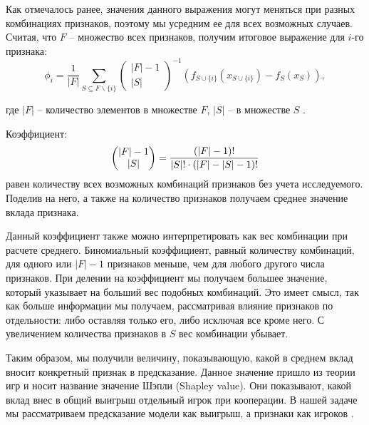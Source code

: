 Как отмечалось ранее, значения данного выражения могут меняться при разных комбинациях признаков, поэтому мы усредним ее для всех возможных случаев. Считая, что $F$ -- множество всех признаков, получим итоговое выражение для $i$-го признака:
\vspace{-1mm}
\[
\phi_i = \frac{1}{|F|} \sum\limits_{S \subseteq F \backslash \{i\}}
\begin{pmatrix}
|F| - 1 \\
|S|
\end{pmatrix}^{-1}
(f_{S \cup \{i\}}(x_{S \cup \{i\}}) - f_S(x_S)),
\]
\vspace{-5mm}

где $|F|$ -- количество элементов в множестве $F$, $|S|$ -- в множестве $S$ \cite{basis, shap}.

Коэффициент:
\[
\displaystyle \begin{pmatrix}
|F| - 1 \\
|S|
\end{pmatrix} = \frac{(|F|-1)!}{|S|! \cdot (|F| - |S| - 1)!}
\]
равен количеству всех возможных комбинаций признаков без учета исследуемого. Поделив на него, а также на количество признаков получаем среднее значение вклада признака.

Данный коэффициент также можно интерпретировать как вес комбинации при расчете среднего. Биномиальный коэффициент, равный количеству комбинаций, для одного или $|F|-1$ признаков меньше, чем для любого другого числа признаков. При делении на коэффициент мы получаем большее значение, который указывает на больший вес подобных комбинаций. Это имеет смысл, так как больше информации мы получаем, рассматривая влияние признаков по отдельности: либо оставляя только его, либо исключая все кроме него. С увеличением количества признаков в $S$ вес комбинации убывает.

Таким образом, мы получили величину, показывающую, какой в среднем вклад вносит конкретный признак в предсказание. Данное значение пришло из теории игр и носит название значение Шэпли (Shapley value). Они показывают, какой вклад внес в общий выигрыш отдельный игрок при кооперации. В нашей задаче мы рассматриваем предсказание модели как выигрыш, а признаки как игроков \cite{basis}.
\vspace{-2mm}